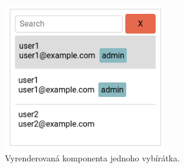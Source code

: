 \begin{figure}[!htb] \centering
  \includegraphics[width=70mm]{../img/picker_component.png}
  \caption{Vyrenderovaná komponenta jednoho vybírátka.}
  \label{fig:picker_component}
\end{figure}

